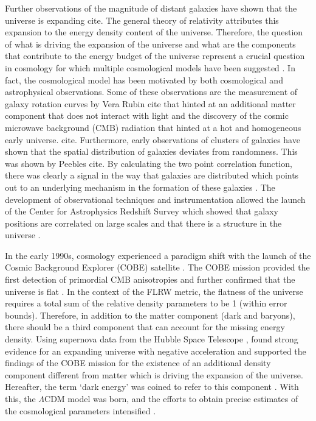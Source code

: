 Further observations of the magnitude of distant galaxies have shown that the universe is expanding {\color{green} cite}. The general theory of relativity attributes this expansion to the energy density content of the universe. Therefore, the question of what is driving the expansion of the universe and what are the components that contribute to the energy budget of the universe represent a crucial question in cosmology for which multiple cosmological models have been suggested \citep{di2025cosmoverse}. In fact, the cosmological model has been motivated by both cosmological and astrophysical observations. Some of these observations are the measurement of galaxy rotation curves by Vera Rubin {\color{green} cite} that hinted at an additional matter component that does not interact with light and the discovery of the cosmic microwave background (CMB) radiation that hinted at a hot and homogeneous early universe.{\color{green} cite}. Furthermore, early observations of clusters of galaxies have shown that the spatial distribution of galaxies deviates from randomness. This was shown by Peebles {\color{green} cite}. By calculating the two point correlation function, there was clearly a signal in the way that galaxies are distributed which points out to an underlying mechanism in the formation of these galaxies \citep{Totsuji_Kihara_1969}. The development of observational techniques and instrumentation allowed the launch of the Center for Astrophysics Redshift Survey \citep{Davis_Huchra_Latham_Tonry_1982} which showed that galaxy positions are correlated on large scales and that there is a structure in the universe \citep{Davis_Peebles_1983}.

In the early 1990s, cosmology experienced a paradigm shift with the launch of the Cosmic Background Explorer (COBE) satellite \citep{Boggess_Mather_etal._1992}. The COBE mission provided the first detection of primordial CMB anisotropies and further confirmed that the universe is flat \citep{Smoot_1999}. In the context of the FLRW metric, the flatness of the universe requires a total sum of the relative density parameters to be 1 (within error bounds). Therefore, in addition to the matter component (dark and baryons), there should be a third component that can account for the missing energy density. Using supernova data from the Hubble Space Telescope \citep{Bahcall_Spitzer_1982}, \citet{Riess_etal._1998} found strong evidence for an expanding universe with negative acceleration and supported the findings of the COBE mission for the existence of an additional density component different from matter which is driving the expansion of the universe. Hereafter, the term `dark energy' was coined to refer to this component \citep{Turner_2001}. With this, the $\Lambda$CDM model was born, and the efforts to obtain precise estimates of the cosmological parameters intensified \citep{Bennett_etal._2003, Pope_2004}.

